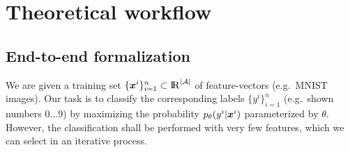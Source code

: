 \section{Theoretical workflow}
\subsection{End-to-end formalization}
We are given a training set $\{\bm x^i\}_{i=1}^n \subset \mathrm{I\kern-0.4ex R}^{|\mathcal{A}|}$ 
of feature-vectors (e.g.~MNIST images).
Our task is to classify the corresponding labels $\{y^i\}_{i=1}^n$
(e.g.~shown numbers $0 \ldots 9$) by maximizing 
the probability $p_\theta(y^i|\bm x^i)$ parameterized by $\theta$.
However, the classification shall be performed with very few features,
which we can select in an iterative process.



